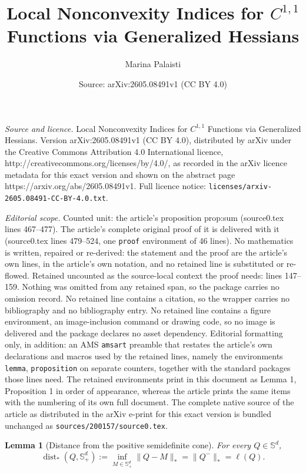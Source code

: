 \documentclass[10pt,a4paper]{amsart}
\title{Local Nonconvexity Indices for \(C^{1,1}\) Functions via Generalized Hessians}
\author{Marina Palaisti}
\date{Source: arXiv:2605.08491v1 (CC BY 4.0)}
\newtheorem{lemma}{Lemma}
\newcommand{\Sd}{\mathbb S^d}
\newcommand{\Spd}{\mathbb S^d_+}
\newcommand{\dist}{\operatorname{dist}}
\begin{document}
\maketitle

\noindent\emph{Source and licence.} Local Nonconvexity Indices for \(C^{1,1}\) Functions via Generalized Hessians. Version arXiv:2605.08491v1 (CC BY 4.0), distributed by arXiv under the Creative Commons Attribution 4.0 International licence, http://creativecommons.org/licenses/by/4.0/, as recorded in the arXiv licence metadata for this exact version and shown on the abstract page https://arxiv.org/abs/2605.08491v1. Full licence notice: \texttt{licenses/arxiv-2605.08491-CC-BY-4.0.txt}.\par\smallskip

\noindent\textit{Editorial scope.} Counted unit: the article's proposition prop:sum (source0.tex lines 467--477). The article's complete original proof of it is delivered with it (source0.tex lines 479--524, one \texttt{proof} environment of 46 lines). No mathematics is written, repaired or re-derived: the statement and the proof are the article's own lines, in the article's own notation, and no retained line is substituted or re-flowed.  Retained uncounted as the source-local context the proof needs: lines 147--159.  Nothing was omitted from any retained span, so the package carries no omission record.  No retained line contains a citation, so the wrapper carries no bibliography and no bibliography entry.  No retained line contains a figure environment, an image-inclusion command or drawing code, so no image is delivered and the package declares no asset dependency.  Editorial formatting only, in addition: an AMS \texttt{amsart} preamble that restates the article's own declarations and macros used by the retained lines, namely the environments \texttt{lemma}, \texttt{proposition} on separate counters, together with the standard packages those lines need.  The retained environments print in this document as Lemma 1, Proposition 1 in order of appearance, whereas the article prints the same items with the numbering of its own full document.  The complete native source of the article as distributed in the arXiv e-print for this exact version is bundled unchanged as \texttt{sources/200157/source0.tex}.
	\begin{lemma}[Distance from the positive semidefinite cone]
		\label{lem:distance}
		For every \(Q\in\Sd\),
		\[
		\dist_*(Q,\Spd)
		:=
		\inf_{M\in\Spd}\|Q-M\|_*
		=
		\|Q^-\|_*
		=
		\ell(Q).
		\]
	\end{lemma}
\end{document}
